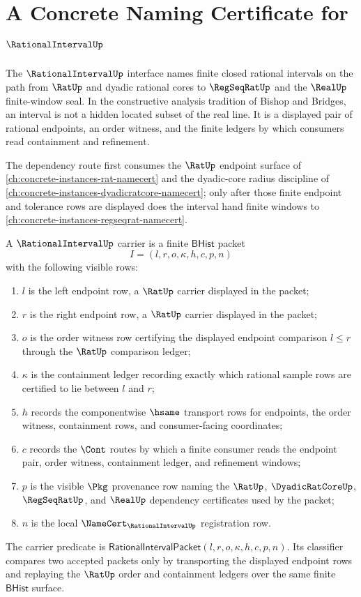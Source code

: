 \chapter{A Concrete Naming Certificate for $\RationalIntervalUp$}
\label{ch:concrete-instances-rationalinterval-namecert}

The $\RationalIntervalUp$ interface names finite closed rational intervals on
the path from $\RatUp$ and dyadic rational cores to $\RegSeqRatUp$ and the
$\RealUp$ finite-window seal. In the constructive analysis tradition of
Bishop and Bridges, an interval is not a hidden located subset of the real
line. It is a displayed pair of rational endpoints, an order witness, and the
finite ledgers by which consumers read containment and refinement.

The dependency route first consumes the $\RatUp$ endpoint surface of
\autoref{ch:concrete-instances-rat-namecert} and the dyadic-core radius
discipline of \autoref{ch:concrete-instances-dyadicratcore-namecert}; only
after those finite endpoint and tolerance rows are displayed does the interval
hand finite windows to \autoref{ch:concrete-instances-regseqrat-namecert}.

\begin{definition}
\label{def:rational-interval-bhist-carrier}
A $\RationalIntervalUp$ carrier is a finite $\mathsf{BHist}$ packet
$$
I=(l,r,o,\kappa,h,c,p,n)
$$
with the following visible rows:
\begin{enumerate}
\item $l$ is the left endpoint row, a $\RatUp$ carrier displayed in the
  packet;
\item $r$ is the right endpoint row, a $\RatUp$ carrier displayed in the
  packet;
\item $o$ is the order witness row certifying the displayed endpoint
  comparison $l \leq r$ through the $\RatUp$ comparison ledger;
\item $\kappa$ is the containment ledger recording exactly which rational
  sample rows are certified to lie between $l$ and $r$;
\item $h$ records the componentwise $\hsame$ transport rows for endpoints,
  the order witness, containment rows, and consumer-facing coordinates;
\item $c$ records the $\Cont$ routes by which a finite consumer reads the
  endpoint pair, order witness, containment ledger, and refinement windows;
\item $p$ is the visible $\Pkg$ provenance row naming the $\RatUp$,
  $\DyadicRatCoreUp$, $\RegSeqRatUp$, and $\RealUp$ dependency certificates
  used by the packet;
\item $n$ is the local $\NameCert_{\RationalIntervalUp}$ registration row.
\end{enumerate}
The carrier predicate is
$\mathsf{RationalIntervalPacket}(l,r,o,\kappa,h,c,p,n)$. Its classifier
compares two accepted packets only by transporting the displayed endpoint
rows and replaying the $\RatUp$ order and containment ledgers over the same
finite $\mathsf{BHist}$ surface.
\end{definition}

